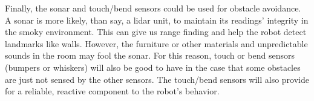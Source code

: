 \documentclass{article}
\begin{document}
\begin{enumerate}
Finally, the sonar and touch/bend sensors could be used for obstacle avoidance. A sonar is more likely, than say, a lidar unit, to maintain its readings' integrity in the smoky environment. This can give us range finding and help the robot detect landmarks like walls. However, the furniture or other materials and unpredictable sounds in the room may fool the sonar. For this reason, touch or bend sensors (bumpers or whiskers) will also be good to have in the case that some obstacles are just not sensed by the other sensors. The touch/bend sensors will also provide for a reliable, reactive component to the robot's behavior. \\
\end{enumerate}
\end{document}
